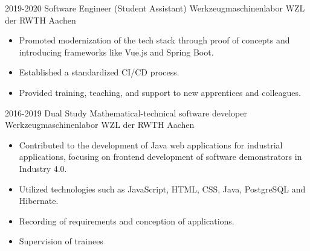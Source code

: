 \documentclass[letterpaper]{twentyonesecondcv} %
\begin{document}
{\begin{twenty}
{\begin{itemize}[leftmargin=5mm,noitemsep,topsep=0pt]
        \end{itemize}
        }
      \twentyitem
        {2019-2020}
        {Software Engineer (Student Assistant)}
        {\newline Werkzeugmaschinenlabor WZL der RWTH Aachen}
        {
        \vspace{-3mm}
         \begin{itemize}[leftmargin=5mm,noitemsep,topsep=0pt]
          \item Promoted modernization of the tech stack through proof of concepts and introducing frameworks like Vue.js and Spring Boot.
          \item Established a standardized CI/CD process.
          \item Provided training, teaching, and support to new apprentices and colleagues.
        \end{itemize}
        }
      \twentyitem
        {2016-2019}
        {Dual Study Mathematical-technical software developer}
        {\newline Werkzeugmaschinenlabor WZL der RWTH Aachen}
        {
        \vspace{-3mm}
        \begin{itemize}[leftmargin=5mm,noitemsep,topsep=0pt]
          \item Contributed to the development of Java web applications for industrial applications, focusing on frontend development of software demonstrators in Industry 4.0.
          \item Utilized technologies such as JavaScript, HTML, CSS, Java, PostgreSQL and Hibernate.
          \item Recording of requirements and conception of applications.
          \item Supervision of trainees
        \end{itemize}
        }
    \end{twenty}

}

\clearpage  %
\end{document}
